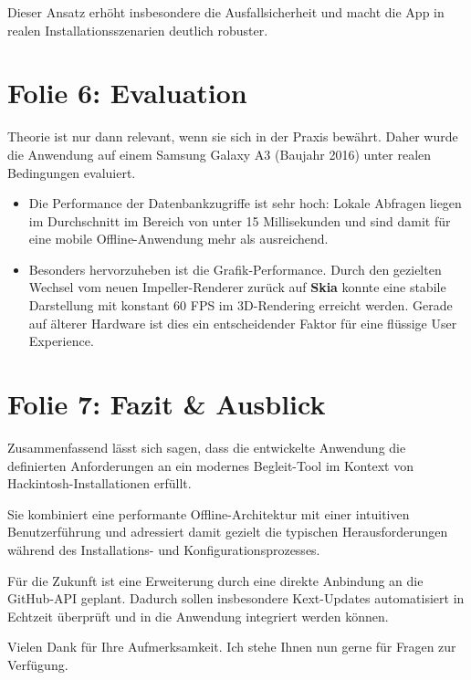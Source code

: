 \documentclass[12pt]{article}
\begin{document}
Dieser Ansatz erhöht insbesondere die Ausfallsicherheit und macht die App in realen Installationsszenarien deutlich robuster.

\section*{Folie 6: Evaluation}
Theorie ist nur dann relevant, wenn sie sich in der Praxis bewährt. Daher wurde die Anwendung auf einem Samsung Galaxy A3 (Baujahr 2016) unter realen Bedingungen evaluiert.

\begin{itemize}
    \item Die Performance der Datenbankzugriffe ist sehr hoch: Lokale Abfragen liegen im Durchschnitt im Bereich von unter 15 Millisekunden und sind damit für eine mobile Offline-Anwendung mehr als ausreichend.

    \item Besonders hervorzuheben ist die Grafik-Performance. Durch den gezielten Wechsel vom neuen Impeller-Renderer zurück auf \textbf{Skia} konnte eine stabile Darstellung mit konstant 60 FPS im 3D-Rendering erreicht werden. Gerade auf älterer Hardware ist dies ein entscheidender Faktor für eine flüssige User Experience.
\end{itemize}

\section*{Folie 7: Fazit \& Ausblick}
Zusammenfassend lässt sich sagen, dass die entwickelte Anwendung die definierten Anforderungen an ein modernes Begleit-Tool im Kontext von Hackintosh-Installationen erfüllt.

Sie kombiniert eine performante Offline-Architektur mit einer intuitiven Benutzerführung und adressiert damit gezielt die typischen Herausforderungen während des Installations- und Konfigurationsprozesses.

Für die Zukunft ist eine Erweiterung durch eine direkte Anbindung an die GitHub-API geplant. Dadurch sollen insbesondere Kext-Updates automatisiert in Echtzeit überprüft und in die Anwendung integriert werden können.

Vielen Dank für Ihre Aufmerksamkeit. Ich stehe Ihnen nun gerne für Fragen zur Verfügung.
\end{document}

